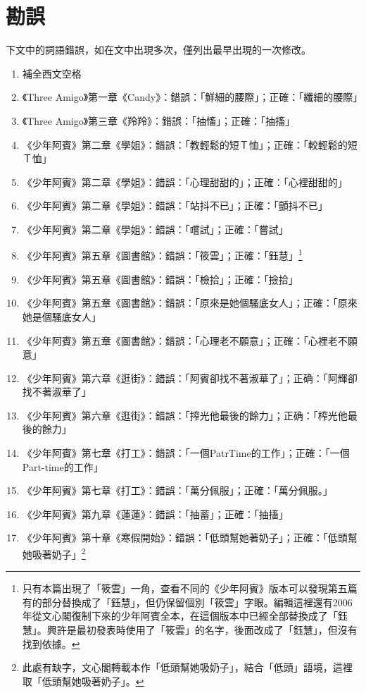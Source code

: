 \chapter*{勘誤}
下文中的詞語錯誤，如在文中出現多次，僅列出最早出現的一次修改。
\begin{enumerate}
\item 補全西文空格
\item 《Three Amigo》第一章《Candy》：錯誤：「鮮細的腰際」；正確：「纖細的腰際」
\item 《Three Amigo》第三章《羚羚》：錯誤：「抽慉」；正確：「抽搐」
\item 《少年阿賓》第二章《學姐》：錯誤：「教輕鬆的短Ｔ恤」；正確：「較輕鬆的短Ｔ恤」
\item 《少年阿賓》第二章《學姐》：錯誤：「心理甜甜的」；正確：「心裡甜甜的」
\item 《少年阿賓》第二章《學姐》：錯誤：「站抖不已」；正確：「顫抖不已」
\item 《少年阿賓》第二章《學姐》：錯誤：「嚐試」；正確：「嘗試」
\item 《少年阿賓》第五章《圖書館》：錯誤：「筱雲」；正確：「鈺慧」\footnote{只有本篇出現了「筱雲」一角，查看不同的《少年阿賓》版本可以發現第五篇有的部分替換成了「鈺慧」，但仍保留個別「筱雲」字眼。編輯這裡還有2006年從文心閣復制下來的少年阿賓全本，在這個版本中已經全部替換成了「鈺慧」。興許是最初發表時使用了「筱雲」的名字，後面改成了「鈺慧」，但沒有找到依據。}
\item 《少年阿賓》第五章《圖書館》：錯誤：「檢拾」；正確：「撿拾」
\item 《少年阿賓》第五章《圖書館》：錯誤：「原來是她個騷底女人」；正確：「原來她是個騷底女人」
\item 《少年阿賓》第五章《圖書館》：錯誤：「心理老不願意」；正確：「心裡老不願意」
\item 《少年阿賓》第六章《逛街》：錯誤：「阿賓卻找不著淑華了」；正确：「阿輝卻找不著淑華了」
\item 《少年阿賓》第六章《逛街》：錯誤：「搾光他最後的餘力」；正确：「榨光他最後的餘力」
\item 《少年阿賓》第七章《打工》：錯誤：「一個PatrTime的工作」；正確：「一個Part-time的工作」
\item 《少年阿賓》第七章《打工》：錯誤：「萬分佩服」；正確：「萬分佩服。」
\item 《少年阿賓》第九章《蓮蓮》：錯誤：「抽蓄」；正確：「抽搐」
\item 《少年阿賓》第十章《寒假開始》：錯誤：「低頭幫她著奶子」；正確：「低頭幫她吸著奶子」\footnote{此處有缺字，文心閣轉載本作「低頭幫她吸奶子」，結合「低頭」語境，這裡取「低頭幫她吸著奶子」。}

\end{enumerate}
